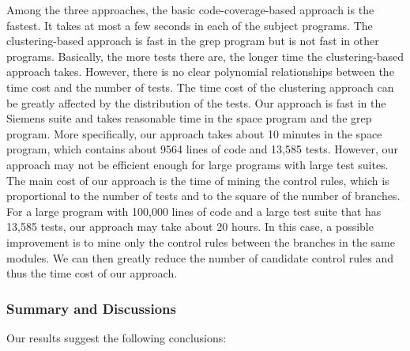 \documentclass{sig-alternate}
\begin{document}
Among the three approaches, the basic code-coverage-based approach
is the fastest. It takes at most a few seconds in each of the
subject programs. The clustering-based approach is fast in the grep
program but is not fast in other programs. Basically, the more tests
there are, the longer time the clustering-based approach takes.
However, there is no clear polynomial relationships between the time
cost and the number of tests. The time cost of the clustering
approach can be greatly affected by the distribution of the tests.
Our approach is fast in the Siemens suite and takes reasonable time
in the space program and the grep program. More specifically, our
approach takes about 10 minutes in the space program, which contains
about 9564 lines of code and 13,585 tests. However, our approach may
not be efficient enough for large programs with large test suites.
The main cost of our approach is the time of mining the control
rules, which is proportional to the number of tests and to the
square of the number of branches. For a large program with 100,000
lines of code and a large test suite that has 13,585 tests, our
approach may take about 20 hours. In this case, a possible
improvement is to mine only the control rules between the branches
in the same modules. We can then greatly reduce the number of
candidate control rules and thus the time cost of our approach.


\subsubsection{Summary and Discussions}

Our results suggest the following conclusions:
\end{document}
